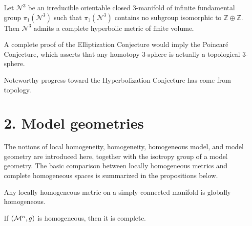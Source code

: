 \begin{conjecture}
\label{ch01-conj-hyperbolization}
Let $\mathcal{N}^3$ be an irreducible orientable closed $3$-manifold of infinite fundamental group $\pi_1(\mathcal{N}^3)$ such that $\pi_1(\mathcal{N}^3)$ contains no subgroup isomorphic to $\mathbb{Z}\oplus\mathbb{Z}$. Then $\mathcal{N}^3$ admits a complete hyperbolic metric of finite volume.
\end{conjecture}

\begin{remark}
\label{ch01-rem-poincare}
A complete proof of the Elliptization Conjecture would imply the Poincar\'e Conjecture, which asserts that any homotopy $3$-sphere is actually a topological $3$-sphere.
\end{remark}

\begin{remark}
\label{ch01-rem-hyperbolization-progress}
Noteworthy progress toward the Hyperbolization Conjecture has come from topology.
\end{remark}

\section*{2. Model geometries}

The notions of local homogeneity, homogeneity, homogeneous model, and model geometry are introduced here, together with the isotropy group of a model geometry. The basic comparison between locally homogeneous metrics and complete homogeneous spaces is summarized in the propositions below.

\begin{proposition}
\label{ch01-prop-singer}
Any locally homogeneous metric on a simply-connected manifold is globally homogeneous.
\end{proposition}

\begin{proposition}
\label{ch01-prop-homogeneous-complete}
If $(\mathcal{M}^n,g)$ is homogeneous, then it is complete.
\end{proposition}

